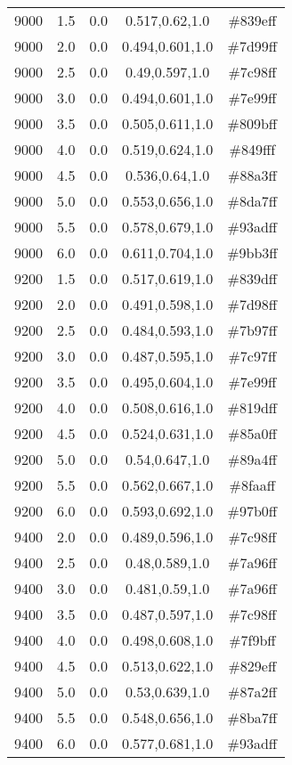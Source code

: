 \begin{tabular}{ccccc}
9000 & 1.5 & 0.0 & 0.517,0.62,1.0 & \#839eff \\ 
9000 & 2.0 & 0.0 & 0.494,0.601,1.0 & \#7d99ff \\ 
9000 & 2.5 & 0.0 & 0.49,0.597,1.0 & \#7c98ff \\ 
9000 & 3.0 & 0.0 & 0.494,0.601,1.0 & \#7e99ff \\ 
9000 & 3.5 & 0.0 & 0.505,0.611,1.0 & \#809bff \\ 
9000 & 4.0 & 0.0 & 0.519,0.624,1.0 & \#849fff \\ 
9000 & 4.5 & 0.0 & 0.536,0.64,1.0 & \#88a3ff \\ 
9000 & 5.0 & 0.0 & 0.553,0.656,1.0 & \#8da7ff \\ 
9000 & 5.5 & 0.0 & 0.578,0.679,1.0 & \#93adff \\ 
9000 & 6.0 & 0.0 & 0.611,0.704,1.0 & \#9bb3ff \\ 
9200 & 1.5 & 0.0 & 0.517,0.619,1.0 & \#839dff \\ 
9200 & 2.0 & 0.0 & 0.491,0.598,1.0 & \#7d98ff \\ 
9200 & 2.5 & 0.0 & 0.484,0.593,1.0 & \#7b97ff \\ 
9200 & 3.0 & 0.0 & 0.487,0.595,1.0 & \#7c97ff \\ 
9200 & 3.5 & 0.0 & 0.495,0.604,1.0 & \#7e99ff \\ 
9200 & 4.0 & 0.0 & 0.508,0.616,1.0 & \#819dff \\ 
9200 & 4.5 & 0.0 & 0.524,0.631,1.0 & \#85a0ff \\ 
9200 & 5.0 & 0.0 & 0.54,0.647,1.0 & \#89a4ff \\ 
9200 & 5.5 & 0.0 & 0.562,0.667,1.0 & \#8faaff \\ 
9200 & 6.0 & 0.0 & 0.593,0.692,1.0 & \#97b0ff \\ 
9400 & 2.0 & 0.0 & 0.489,0.596,1.0 & \#7c98ff \\ 
9400 & 2.5 & 0.0 & 0.48,0.589,1.0 & \#7a96ff \\ 
9400 & 3.0 & 0.0 & 0.481,0.59,1.0 & \#7a96ff \\ 
9400 & 3.5 & 0.0 & 0.487,0.597,1.0 & \#7c98ff \\ 
9400 & 4.0 & 0.0 & 0.498,0.608,1.0 & \#7f9bff \\ 
9400 & 4.5 & 0.0 & 0.513,0.622,1.0 & \#829eff \\ 
9400 & 5.0 & 0.0 & 0.53,0.639,1.0 & \#87a2ff \\ 
9400 & 5.5 & 0.0 & 0.548,0.656,1.0 & \#8ba7ff \\ 
9400 & 6.0 & 0.0 & 0.577,0.681,1.0 & \#93adff \\ 

\end{tabular}
